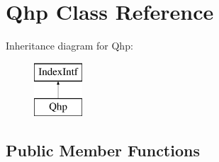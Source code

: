 \hypertarget{class_qhp}{}\section{Qhp Class Reference}
\label{class_qhp}
Inheritance diagram for Qhp\+:\begin{figure}[H]
\begin{center}
\leavevmode
\includegraphics[height=2.000000cm]{class_qhp}
\end{center}
\end{figure}
\subsection*{Public Member Functions}
